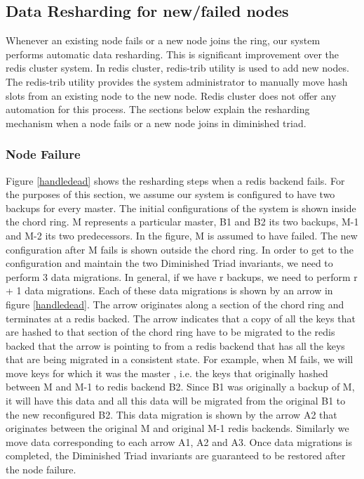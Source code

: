 \documentclass[10pt,twocolumn,letterpaper]{article}
\begin{document}
\subsection{Data Resharding for new/failed nodes}

Whenever an existing node fails or a new node joins the ring, our system performs automatic data resharding. This is significant improvement over the redis cluster system. In redis cluster, redis-trib utility is used to add new nodes. The redis-trib utility provides the system administrator to manually move hash slots from an existing node to the new node. Redis cluster does not offer any automation for this process. The sections below explain the resharding mechanism when a node fails or a new node joins in diminished triad. 

\subsubsection{Node Failure}
Figure \ref{handledead} shows the resharding steps when a redis backend fails. For the purposes of this section, we assume our system is configured to have two backups for every master. The initial configurations of the system is shown inside the chord ring. M represents a particular master, B1 and B2 its two backups, M-1 and M-2 its two predecessors. In the figure, M is assumed to have failed. The new configuration after M fails is shown outside the chord ring. In order to get to the configuration and maintain the two Diminished Triad invariants, we need to perform 3 data migrations. In general, if we have r backups, we need to perform r + 1 data migrations. Each of these data migrations is shown by an arrow in figure \ref{handledead}. The arrow originates along a section of the chord ring and terminates at a redis backed. The arrow indicates that a copy of all the keys that are hashed to that section of the chord ring have to be migrated to the redis backed that the arrow is pointing to from a redis backend that has all the keys that are being migrated in a consistent state. For example, when M fails, we will move keys for which it was the master , i.e. the keys that originally hashed between M and M-1 to redis backend B2. Since B1 was originally a backup of M, it will have this data and all this data will be migrated from the original B1 to the new reconfigured B2. This data migration is shown by the arrow A2 that originates between the original M and original M-1 redis backends. Similarly we move data corresponding to each arrow A1, A2 and A3. Once data migrations is completed, the Diminished Triad invariants are guaranteed to be restored after the node failure.
\end{document}

